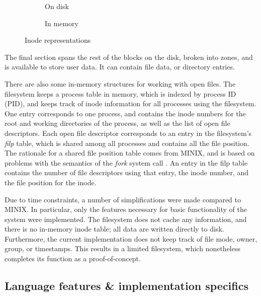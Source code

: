 \begin{figure}
  \centering
  \begin{subfigure}[b]{0.49\textwidth}
    \centering
    \caption{On disk}
    \label{fig:inode on disk}
  \end{subfigure}
  \hfill
  \begin{subfigure}[b]{0.49\textwidth}
    \centering
    \caption{In memory}
    \label{fig:inode in memory}
  \end{subfigure}
  \hfill
  \caption{Inode representations}
  \label{fig:inode representations}
\end{figure}

The final section spans the rest of the blocks on the disk, broken into zones, and is available to store user data.
It can contain file data, or directory entries.

There are also some in-memory structures for working with open files.
The filesystem keeps a process table in memory, which is indexed by process ID (PID), and keeps track of inode information for all processes using the filesystem.
One entry corresponds to one process, and contains the inode numbers for the root and working directories of the process, as well as the list of open file descriptors.
Each open file descriptor corresponds to an entry in the filesystem's \textit{filp} table, which is shared among all processes and contains all the file position.
The rationale for a shared file position table comes from MINIX, and is based on problems with the semantics of the \textit{fork} system call \cite{tanenbaum1997}.
An entry in the filp table contains the number of file descriptors using that entry, the inode number, and the file position for the inode.

Due to time constraints, a number of simplifications were made compared to MINIX.
In particular, only the features necessary for basic functionality of the system were implemented.
The filesystem does not cache any information, and there is no in-memory inode table; all data are written directly to disk.
Furthermore, the current implementation does not keep track of file mode, owner, group, or timestamps.
This results in a limited filesystem, which nonetheless completes its function as a proof-of-concept.

\subsection{Language features \& implementation specifics}
